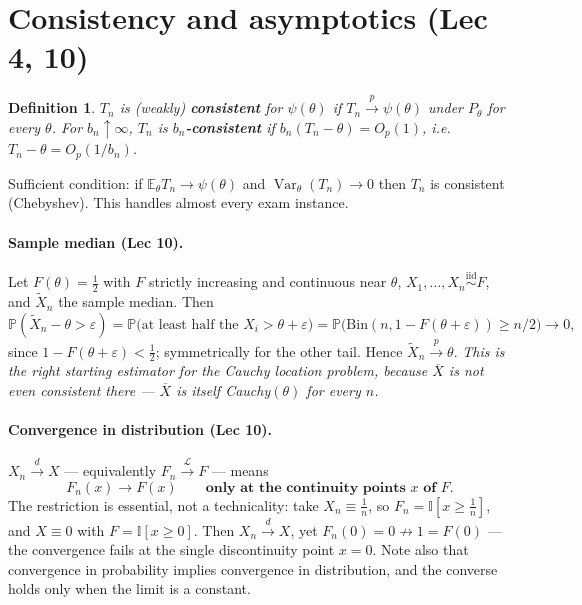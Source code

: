 \documentclass[11pt]{article}
\newtheorem{definition}[theorem]{Definition}
\theoremstyle{remark}
\newcommand{\E}{\mathbb{E}}
\newcommand{\Var}{\operatorname{Var}}
\newcommand{\Prob}{\mathbb{P}}
\newcommand{\Xbar}{\overline{X}}
\newcommand{\iid}{\overset{\text{iid}}{\sim}}
\newcommand{\pto}{\overset{p}{\longrightarrow}}
\newcommand{\dto}{\overset{d}{\longrightarrow}}
\newcommand{\I}{\mathbb{I}}
\begin{document}
\section{Consistency and asymptotics (Lec 4, 10)}

\begin{definition}
$T_n$ is (weakly) \textbf{consistent} for $\psi(\theta)$ if $T_n\pto\psi(\theta)$ under
$P_\theta$ for every $\theta$. For $b_n\uparrow\infty$, $T_n$ is \textbf{$b_n$-consistent} if
$b_n(T_n-\theta)=O_p(1)$, i.e.\ $T_n-\theta=O_p(1/b_n)$.
\end{definition}

Sufficient condition: if $\E_\theta T_n\to\psi(\theta)$ and $\Var_\theta(T_n)\to0$ then $T_n$
is consistent (Chebyshev). This handles almost every exam instance.

\paragraph{Sample median (Lec 10).} Let $F(\theta)=\tfrac12$ with $F$ strictly increasing and
continuous near $\theta$, $X_1,\dots,X_n\iid F$, and $\tilde X_n$ the sample median. Then
\[
\Prob(\tilde X_n-\theta>\varepsilon)=\Prob\big(\text{at least half the }X_i>\theta+\varepsilon\big)
=\Prob\big(\mathrm{Bin}(n,1-F(\theta+\varepsilon))\ge n/2\big)\to0,
\]
since $1-F(\theta+\varepsilon)<\tfrac12$; symmetrically for the other tail. Hence
$\tilde X_n\pto\theta$. \emph{This is the right starting estimator for the Cauchy location
problem, because $\Xbar$ is not even consistent there --- $\Xbar$ is itself Cauchy$(\theta)$
for every $n$.}

\paragraph{Convergence in distribution (Lec 10).}
$X_n\dto X$ --- equivalently $F_n\overset{\mathcal L}{\longrightarrow}F$ --- means
\[
F_n(x)\longrightarrow F(x)\qquad\textbf{only at the continuity points $x$ of $F$.}
\]
The restriction is essential, not a technicality: take $X_n\equiv\tfrac1n$, so
$F_n=\I[x\ge\tfrac1n]$, and $X\equiv0$ with $F=\I[x\ge0]$. Then $X_n\dto X$, yet
$F_n(0)=0\not\to1=F(0)$ --- the convergence fails at the single discontinuity point $x=0$.
Note also that convergence in probability implies convergence in distribution, and the
converse holds only when the limit is a constant.
\end{document}
